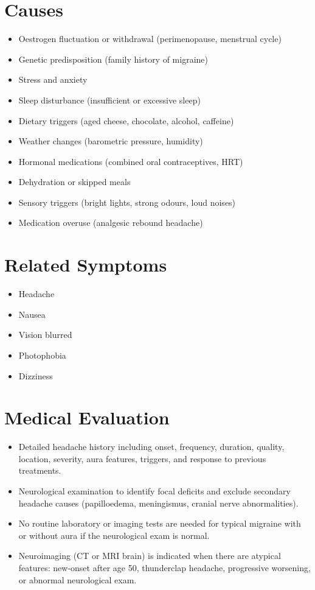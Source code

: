 \section*{Causes}
\begin{itemize}
  \item Oestrogen fluctuation or withdrawal (perimenopause, menstrual cycle)
  \item Genetic predisposition (family history of migraine)
  \item Stress and anxiety
  \item Sleep disturbance (insufficient or excessive sleep)
  \item Dietary triggers (aged cheese, chocolate, alcohol, caffeine)
  \item Weather changes (barometric pressure, humidity)
  \item Hormonal medications (combined oral contraceptives, HRT)
  \item Dehydration or skipped meals
  \item Sensory triggers (bright lights, strong odours, loud noises)
  \item Medication overuse (analgesic rebound headache)
\end{itemize}

\section*{Related Symptoms}
\begin{itemize}
  \item Headache
  \item Nausea
  \item Vision blurred
  \item Photophobia
  \item Dizziness
\end{itemize}


\section*{Medical Evaluation}
\begin{itemize}
  \item Detailed headache history including onset, frequency, duration, quality, location, severity, aura features, triggers, and response to previous treatments.
  \item Neurological examination to identify focal deficits and exclude secondary headache causes (papilloedema, meningismus, cranial nerve abnormalities).
  \item No routine laboratory or imaging tests are needed for typical migraine with or without aura if the neurological exam is normal.
  \item Neuroimaging (CT or MRI brain) is indicated when there are atypical features: new-onset after age 50, thunderclap headache, progressive worsening, or abnormal neurological exam.
\end{itemize}

